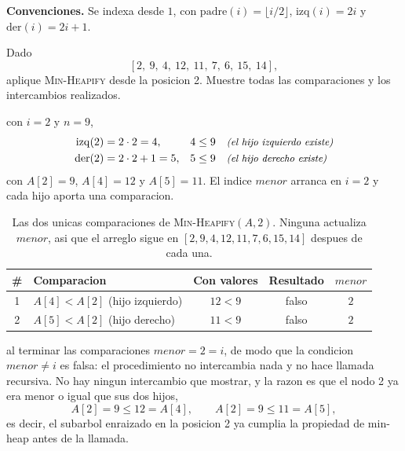 \documentclass[11pt,letterpaper]{article}
\begin{document}

\noindent\textbf{Convenciones.}
Se indexa desde $1$, con $\mathrm{padre}(i) = \lfloor i/2
\rfloor$, $\mathrm{izq}(i) = 2i$ y $\mathrm{der}(i) = 2i + 1$.

\noindent Dado
\[
  [2,\ 9,\ 4,\ 12,\ 11,\ 7,\ 6,\ 15,\ 14],
\]
aplique \textsc{Min-Heapify} desde la posicion 2. Muestre todas las
comparaciones y los intercambios realizados.

 con $i = 2$ y $n = 9$,
\begin{align*}
  \mathrm{izq}(2) &= 2 \cdot 2 = 4, & 4 &\le 9
    \quad\text{\small\itshape (el hijo izquierdo existe)} \\
  \mathrm{der}(2) &= 2 \cdot 2 + 1 = 5, & 5 &\le 9
    \quad\text{\small\itshape (el hijo derecho existe)}
\end{align*}
con $A[2] = 9$, $A[4] = 12$ y $A[5] = 11$. El indice
$\mathit{menor}$ arranca en $i = 2$ y cada hijo aporta una
comparacion.


\begin{table}[H]
  \centering
  \begin{tabular}{c l c c c}
    \toprule
    \# & Comparacion & Con valores & Resultado &
      $\mathit{menor}$ \\
    \midrule
    1 & $A[4] < A[2]$ (hijo izquierdo) & $12 < 9$ & falso & $2$ \\
    2 & $A[5] < A[2]$ (hijo derecho)   & $11 < 9$ & falso & $2$ \\
    \bottomrule
  \end{tabular}
  \caption{Las dos unicas comparaciones de
    \textsc{Min-Heapify}$(A, 2)$. Ninguna actualiza
    $\mathit{menor}$, asi que el arreglo sigue en
    $[2,9,4,12,11,7,6,15,14]$ despues de cada una.}
  \label{ej17:ej17-comparaciones}
\end{table}

 al terminar las comparaciones
$\mathit{menor} = 2 = i$, de modo que la condicion
$\mathit{menor} \neq i$ es falsa: el procedimiento no intercambia
nada y no hace llamada recursiva. No hay ningun intercambio que
mostrar, y la razon es que el nodo 2 ya era menor o igual que sus dos
hijos,
\[
  A[2] = 9 \le 12 = A[4],
  \qquad
  A[2] = 9 \le 11 = A[5],
\]
es decir, el subarbol enraizado en la posicion 2 ya cumplia la
propiedad de min-heap antes de la llamada.

\end{document}
